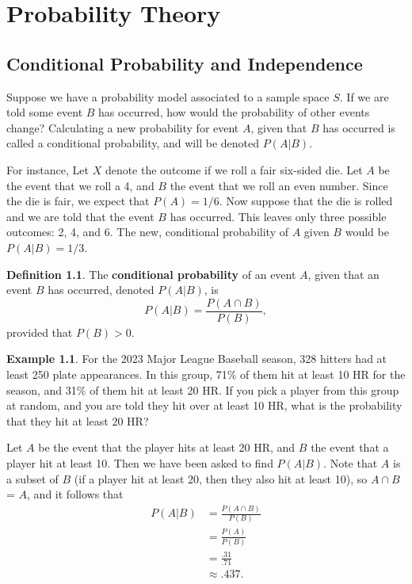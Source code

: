 \documentclass[
]{book}
\theoremstyle{definition}
\newtheorem{definition}{Definition}[chapter]
\theoremstyle{definition}
\newtheorem{example}{Example}[chapter]
\theoremstyle{definition}
\theoremstyle{definition}
\theoremstyle{remark}
\begin{document}
\chapter{Probability Theory}\label{probability-theory}

\section{Conditional Probability and Independence}\label{conditional-probability-and-independence}

Suppose we have a probability model associated to a sample space \(S\). If we are told some event \(B\) has occurred, how would the probability of other events change? Calculating a new probability for event \(A\), given that \(B\) has occurred is called a conditional probability, and will be denoted \(P(A|B)\).

For instance, Let \(X\) denote the outcome if we roll a fair six-sided die. Let \(A\) be the event that we roll a 4, and \(B\) the event that we roll an even number. Since the die is fair, we expect that \(P(A) = 1/6\). Now suppose that the die is rolled and we are told that the event \(B\) has occurred. This leaves only three possible outcomes: 2, 4, and 6. The new, conditional probability of \(A\) given \(B\) would be \(P(A|B) = 1/3.\)

\begin{definition}
\protect\hypertarget{def:cond-prob}{}\label{def:cond-prob}The \textbf{conditional probability} of an event \(A\), given that an event \(B\) has occurred, denoted \(P(A|B)\), is
\begin{equation} 
  P(A|B) = \frac{P(A \cap B)}{P(B)},
  \label{eq:condprob}
\end{equation}
provided that \(P(B) > 0\).
\end{definition}

\begin{example}
For the 2023 Major League Baseball season, 328 hitters had at least 250 plate appearances. In this group, 71\% of them hit at least 10 HR for the season, and 31\% of them hit at least 20 HR. If you pick a player from this group at random, and you are told they hit over at least 10 HR, what is the probability that they hit at least 20 HR?

Let \(A\) be the event that the player hits at least 20 HR, and \(B\) the event that a player hit at least 10. Then we have been asked to find \(P(A|B)\). Note that \(A\) is a subset of \(B\) (if a player hit at least 20, then they also hit at least 10), so \(A \cap B\) = \(A\), and it follows that
\begin{align*}
P(A|B) &= \frac{P(A \cap B)}{P(B)} \\
      &= \frac{P(A)}{P(B)} \\
      &= \frac{.31}{.71}\\
      &\approx .437.
\end{align*}
\end{example}
\end{document}
